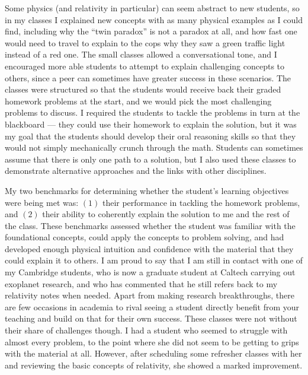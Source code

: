 \documentclass[11pt,letterpaper,sans]{moderncv} %
\begin{document}
Some physics (and relativity in particular) can seem abstract to new students, so in my classes I explained new concepts with as many physical examples as I could find, including why the ``twin paradox'' is not a paradox at all, and how fast one would need to travel to explain to the cops why they saw a green traffic light instead of a red one. The small classes allowed a conversational tone, and I encouraged more able students to attempt to explain challenging concepts to others, since a peer can sometimes have greater success in these scenarios. The classes were structured so that the students would receive back their graded homework problems at the start, and we would pick the most challenging problems to discuss. I required the students to tackle the problems in turn at the blackboard --- they could use their homework to explain the solution, but it was my goal that the students should develop their oral reasoning skills so that they would not simply mechanically crunch through the math. Students can sometimes assume that there is only one path to a solution, but I also used these classes to demonstrate alternative approaches and the links with other disciplines. 
\vspace{1mm}

My two benchmarks for determining whether the student's learning objectives were being met was: $(1)$ their performance in tackling the homework problems, and  $(2)$ their ability to coherently explain the solution to me and the rest of the class. These benchmarks assessed whether the student was familiar with the foundational concepts, could apply the concepts to problem solving, and had developed enough physical intuition and confidence with the material that they could explain it to others. I am proud to say that I am still in contact with one of my Cambridge students, who is now a graduate student at Caltech carrying out exoplanet research, and who has commented that he still refers back to my relativity notes when needed. Apart from making research breakthroughs, there are few occasions in academia to rival seeing a student directly benefit from your teaching and build on that for their own success. These classes were not without their share of challenges though. I had a student who seemed to struggle with almost every problem, to the point where she did not seem to be getting to grips with the material at all. However, after scheduling some refresher classes with her and reviewing the basic concepts of relativity, she showed a marked improvement.
\vspace{1mm}
\end{document}
